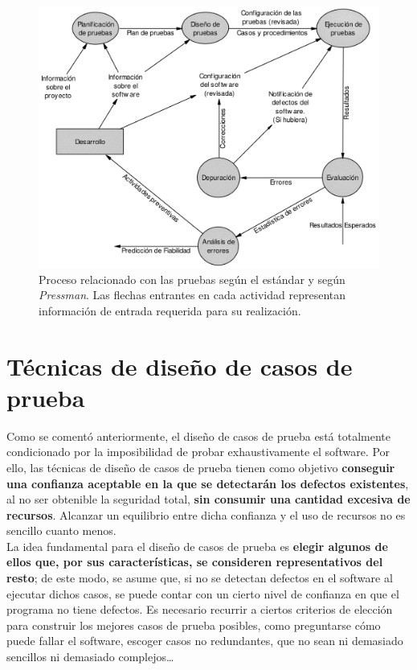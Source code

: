 \begin{figure}[H]
    \centering
    \includegraphics[width=0.8\linewidth]{Resources/Tema6/ProcesoPruebas_IEEE_Pressman.png}
    \caption{Proceso relacionado con las pruebas según el estándar y según \textit{Pressman}. Las flechas entrantes en cada actividad representan información de entrada requerida para su realización.}
\end{figure}


\section{Técnicas de diseño de casos de prueba}

Como se comentó anteriormente, el diseño de casos de prueba está totalmente condicionado por la imposibilidad de probar exhaustivamente el software. Por ello, las técnicas de diseño de casos de prueba tienen como objetivo \textbf{conseguir una confianza aceptable en la que se detectarán los defectos existentes}, al no ser obtenible la seguridad total, \textbf{sin consumir una cantidad excesiva de recursos}. Alcanzar un equilibrio entre dicha confianza y el uso de recursos no es sencillo cuanto menos.\\

La idea fundamental para el diseño de casos de prueba es \textbf{elegir algunos de ellos que, por sus características, se consideren representativos del resto}; de este modo, se asume que, si no se detectan defectos en el software al ejecutar dichos casos, se puede contar con un cierto nivel de confianza en que el programa no tiene defectos. Es necesario recurrir a ciertos criterios de elección para construir los mejores casos de prueba posibles, como preguntarse cómo puede fallar el software, escoger casos no redundantes, que no sean ni demasiado sencillos ni demasiado complejos\ldots\\

